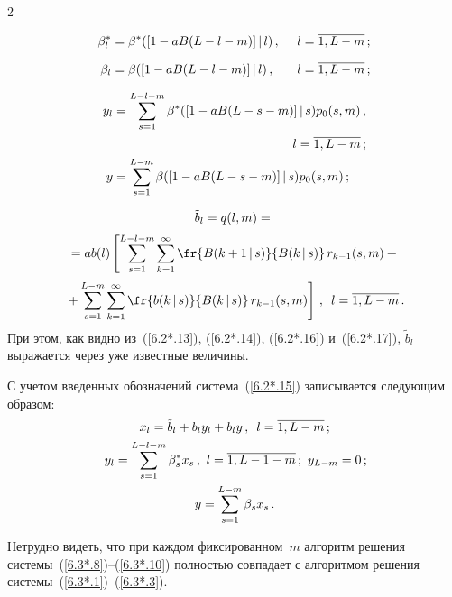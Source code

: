 \begin{multicols}{2}
\vspace*{-3pt}

\pagebreak

\noindent
\begin{alignat*}{2}
\beta^*_l&=\beta^*([1 - a B(L-l-m)]\,|\,l)\,,&\enskip l&=\overline{1,L-m}\,;
\\[6pt]
\beta_l&=\beta([1 - a B(L-l-m)]\,|\,l)\,,&\enskip l&=\overline{1,L-m}\,;
\end{alignat*}

\vspace*{-12pt}

\noindent
\begin{align*}
y_l&=\sum\limits_{s=1}^{L-l-m}\beta^*([1 - a B(L-s-m)]\,|\,s)
p_{0}(s,m)\,,\\[1pt]
&\hspace*{50mm}l=\overline{1,L-m}\,;\\
y&=\sum\limits_{s=1}^{L-m}\beta([1 - a B(L-s-m)]\,|\,s)p_{0}(s,m)\,;
\end{align*}

\vspace*{-12pt}

\noindent
\begin{multline*}
\tilde b_l=q(l,m)={}\\[2pt]
{}=a b(l)\left[\sum\limits_{s=1}^{L-l-m}
\sum\limits_{k=1}^\infty\fr{B(k+1\,|\,s) }{B(k\,|\,s)}\,
r_{k-1}(s,m) +
{}\right.\\[2pt]
\left.{}+
\sum\limits_{s=1}^{L-m} \sum\limits_{k=1}^\infty
\fr{b(k\,|\,s)}{ B(k\,|\,s)}\,
r_{k-1}(s,m)
\right]\,,\enskip l=\overline{1,L-m}\,.
\end{multline*}
При этом, как видно из~(\ref{6.2*.13}), (\ref{6.2*.14}),
(\ref{6.2*.16}) и~(\ref{6.2*.17}), $\tilde b_l$
выражается через уже известные величины.

С учетом введенных обозначений
сис\-те\-ма~(\ref{6.2*.15}) записывается сле\-ду\-ющим об\-разом:
\begin{gather}
\label{6.3*.8}
x_{l}= \tilde b_l + b_l y_l + b_l y \,,\enskip l=\overline{1,L-m}\,;
\\
\!y_l = \sum\limits_{s=1}^{L-l-m} \beta^*_s x_s\,,\
l=\overline{1,L-1-m}\,;\  y_{L-m} = 0\,;\!\!
\label{6.3*.9}
\\
\label{6.3*.10}
y= \sum\limits_{s=1}^{L-m} \beta_s x_s \,.
\end{gather}

Нетрудно видеть, что при каждом фиксированном~$m$
алгоритм решения сис\-те\-мы~(\ref{6.3*.8})--(\ref{6.3*.10})
полностью совпадает с алгоритмом решения сис\-те\-мы~(\ref{6.3*.1})--(\ref{6.3*.3}).


\end{multicols}
